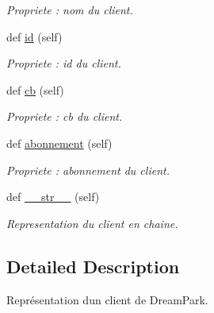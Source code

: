 \begin{DoxyCompactItemize}
\begin{DoxyCompactList}\small\item\em Propriete \+: nom du client. \end{DoxyCompactList}\item 
\hypertarget{classm_1_1_client_1_1_client_a75b4707b86a6aef8fe5db181ce21bc4f}{}def \hyperlink{classm_1_1_client_1_1_client_a75b4707b86a6aef8fe5db181ce21bc4f}{id} (self)\label{classm_1_1_client_1_1_client_a75b4707b86a6aef8fe5db181ce21bc4f}

\begin{DoxyCompactList}\small\item\em Propriete \+: id du client. \end{DoxyCompactList}\item 
\hypertarget{classm_1_1_client_1_1_client_acfc771bedeb851068a978bacac44eb3e}{}def \hyperlink{classm_1_1_client_1_1_client_acfc771bedeb851068a978bacac44eb3e}{cb} (self)\label{classm_1_1_client_1_1_client_acfc771bedeb851068a978bacac44eb3e}

\begin{DoxyCompactList}\small\item\em Propriete \+: cb du client. \end{DoxyCompactList}\item 
\hypertarget{classm_1_1_client_1_1_client_a20dce831dce82f76ef3902b72a732717}{}def \hyperlink{classm_1_1_client_1_1_client_a20dce831dce82f76ef3902b72a732717}{abonnement} (self)\label{classm_1_1_client_1_1_client_a20dce831dce82f76ef3902b72a732717}

\begin{DoxyCompactList}\small\item\em Propriete \+: abonnement du client. \end{DoxyCompactList}\item 
\hypertarget{classm_1_1_client_1_1_client_a27aa0692667670744df6c39d262507a4}{}def \hyperlink{classm_1_1_client_1_1_client_a27aa0692667670744df6c39d262507a4}{\+\_\+\+\_\+str\+\_\+\+\_\+} (self)\label{classm_1_1_client_1_1_client_a27aa0692667670744df6c39d262507a4}

\begin{DoxyCompactList}\small\item\em Representation du client en chaine. \end{DoxyCompactList}\end{DoxyCompactItemize}


\subsection{Detailed Description}
Représentation d\textquotesingle{}un client de Dream\+Park. 

